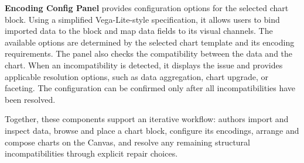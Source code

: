 \textbf{Encoding Config Panel} provides configuration options for the selected
chart block. Using a simplified Vega-Lite-style specification, it allows
users to bind imported data to the block and map data fields to its visual
channels. The available options are determined by the selected chart
template and its encoding requirements. The panel also checks the
compatibility between the data and the chart. When an incompatibility is
detected, it displays the issue and provides applicable resolution options,
such as data aggregation, chart upgrade, or faceting. The configuration can
be confirmed only after all incompatibilities have been resolved.

Together, these components support an iterative workflow: authors import and
inspect data, browse and place a chart block, configure its encodings, arrange
and compose charts on the Canvas, and resolve any remaining structural
incompatibilities through explicit repair choices.








